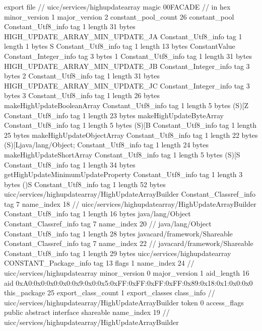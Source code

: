export file {		// uicc/services/highupdatearray
	magic	00FACADE		 // in hex
	minor_version	1
	major_version	2
	constant_pool_count	26
	constant_pool {
		Constant_Utf8_info {
			tag	1
			length	31
			bytes	HIGH_UPDATE_ARRAY_MIN_UPDATE_JA
		}
		Constant_Utf8_info {
			tag	1
			length	1
			bytes	S
		}
		Constant_Utf8_info {
			tag	1
			length	13
			bytes	ConstantValue
		}
		Constant_Integer_info {
			tag	3
			bytes	1
		}
		Constant_Utf8_info {
			tag	1
			length	31
			bytes	HIGH_UPDATE_ARRAY_MIN_UPDATE_JB
		}
		Constant_Integer_info {
			tag	3
			bytes	2
		}
		Constant_Utf8_info {
			tag	1
			length	31
			bytes	HIGH_UPDATE_ARRAY_MIN_UPDATE_JC
		}
		Constant_Integer_info {
			tag	3
			bytes	3
		}
		Constant_Utf8_info {
			tag	1
			length	26
			bytes	makeHighUpdateBooleanArray
		}
		Constant_Utf8_info {
			tag	1
			length	5
			bytes	(S)[Z
		}
		Constant_Utf8_info {
			tag	1
			length	23
			bytes	makeHighUpdateByteArray
		}
		Constant_Utf8_info {
			tag	1
			length	5
			bytes	(S)[B
		}
		Constant_Utf8_info {
			tag	1
			length	25
			bytes	makeHighUpdateObjectArray
		}
		Constant_Utf8_info {
			tag	1
			length	22
			bytes	(S)[Ljava/lang/Object;
		}
		Constant_Utf8_info {
			tag	1
			length	24
			bytes	makeHighUpdateShortArray
		}
		Constant_Utf8_info {
			tag	1
			length	5
			bytes	(S)[S
		}
		Constant_Utf8_info {
			tag	1
			length	34
			bytes	getHighUpdateMinimumUpdateProperty
		}
		Constant_Utf8_info {
			tag	1
			length	3
			bytes	()S
		}
		Constant_Utf8_info {
			tag	1
			length	52
			bytes	uicc/services/highupdatearray/HighUpdateArrayBuilder
		}
		Constant_Classref_info {
			tag	7
			name_index	18		// uicc/services/highupdatearray/HighUpdateArrayBuilder
		}
		Constant_Utf8_info {
			tag	1
			length	16
			bytes	java/lang/Object
		}
		Constant_Classref_info {
			tag	7
			name_index	20		// java/lang/Object
		}
		Constant_Utf8_info {
			tag	1
			length	28
			bytes	javacard/framework/Shareable
		}
		Constant_Classref_info {
			tag	7
			name_index	22		// javacard/framework/Shareable
		}
		Constant_Utf8_info {
			tag	1
			length	29
			bytes	uicc/services/highupdatearray
		}
		CONSTANT_Package_info {
			tag	13
			flags	1
			name_index	24		// uicc/services/highupdatearray
			minor_version	0
			major_version	1
			aid_length	16
			aid	0xA0:0x0:0x0:0x0:0x9:0x0:0x5:0xFF:0xFF:0xFF:0xFF:0x89:0x18:0x1:0x0:0x0
		}
	}
	this_package	25
	export_class_count	1
	export_classes {
		class_info {		// uicc/services/highupdatearray/HighUpdateArrayBuilder
			token	0
			access_flags	public abstract interface shareable
			name_index	19		// uicc/services/highupdatearray/HighUpdateArrayBuilder
}}}
